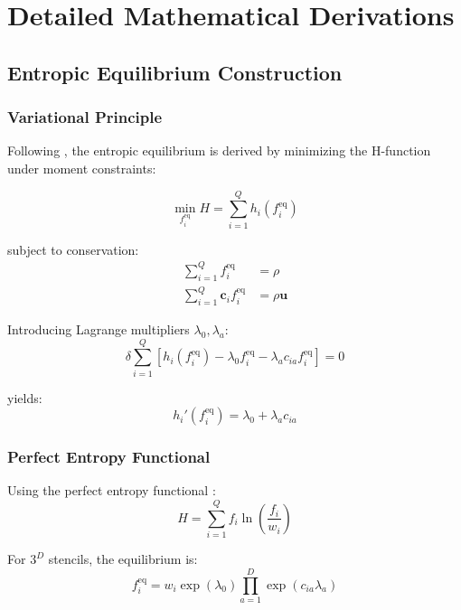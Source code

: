 \chapter{Detailed Mathematical Derivations}

\section{Entropic Equilibrium Construction}

\subsection{Variational Principle}

Following \citet{karlin1999}, the entropic equilibrium is derived by minimizing the H-function under moment constraints:

\begin{equation}
\min_{f_i^{\mathrm{eq}}} H = \sum_{i=1}^{Q} h_i(f_i^{\mathrm{eq}})
\end{equation}

subject to conservation:
\begin{align}
\sum_{i=1}^{Q} f_i^{\mathrm{eq}} &= \rho \\
\sum_{i=1}^{Q} \mathbf{c}_i f_i^{\mathrm{eq}} &= \rho\mathbf{u}
\end{align}

Introducing Lagrange multipliers $\lambda_0, \lambda_a$:
\begin{equation}
\delta \sum_{i=1}^{Q}\left[h_i(f_i^{\mathrm{eq}}) - \lambda_0 f_i^{\mathrm{eq}} - \lambda_a c_{ia} f_i^{\mathrm{eq}}\right] = 0
\end{equation}

yields:
\begin{equation}
h_i'(f_i^{\mathrm{eq}}) = \lambda_0 + \lambda_a c_{ia}
\end{equation}

\subsection{Perfect Entropy Functional}

Using the perfect entropy functional \citep{karlin1999}:
\begin{equation}
H = \sum_{i=1}^{Q} f_i \ln\left(\frac{f_i}{w_i}\right)
\end{equation}

For $3^D$ stencils, the equilibrium is:
\begin{equation}
f_i^{\mathrm{eq}} = w_i \exp(\lambda_0) \prod_{a=1}^{D} \exp(c_{ia}\lambda_a)
\end{equation}

